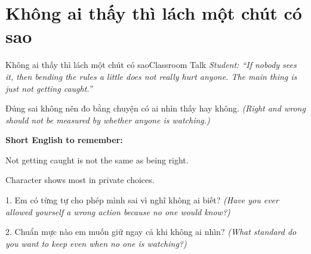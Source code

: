 \section{Không ai thấy thì lách một chút có sao}
\begin{truyen}{Không ai thấy thì lách một chút có sao}{Classroom Talk}
\textit{Student: ``If nobody sees it, then bending the rules a little does not really hurt anyone. The main thing is just not getting caught.''}\\[4pt]



\end{truyen}

\begin{baihoc}
Đúng sai không nên đo bằng chuyện có ai nhìn thấy hay không.
\textit{(Right and wrong should not be measured by whether anyone is watching.)}
\end{baihoc}

\begin{ghinhoanh}
\textbf{Short English to remember:}

Not getting caught is not the same as being right.

Character shows most in private choices.
\end{ghinhoanh}

\begin{tuhocnhanh}
1. Em có từng tự cho phép mình sai vì nghĩ không ai biết? \textit{(Have you ever allowed yourself a wrong action because no one would know?)}

2. Chuẩn mực nào em muốn giữ ngay cả khi không ai nhìn? \textit{(What standard do you want to keep even when no one is watching?)}
\end{tuhocnhanh}
\ngancach